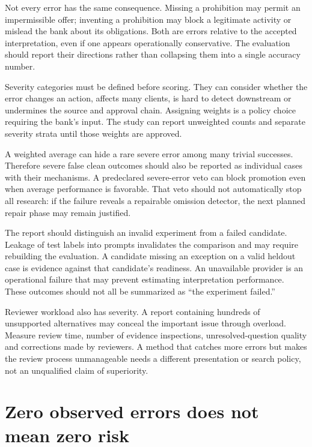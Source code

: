 Not every error has the same consequence. Missing a prohibition may permit an
impermissible offer; inventing a prohibition may block a legitimate activity or
mislead the bank about its obligations. Both are errors relative to the accepted
interpretation, even if one appears operationally conservative. The evaluation
should report their directions rather than collapsing them into a single accuracy
number.

Severity categories must be defined before scoring. They can consider whether the
error changes an action, affects many clients, is hard to detect downstream or
undermines the source and approval chain. Assigning weights is a policy choice
requiring the bank's input. The study can report unweighted counts and separate
severity strata until those weights are approved.


A weighted average can hide a rare severe error among many trivial successes.
Therefore severe false clean outcomes should also be reported as individual cases
with their mechanisms. A predeclared severe-error veto can block promotion even
when average performance is favorable. That veto should not automatically stop
all research: if the failure reveals a repairable omission detector, the next
planned repair phase may remain justified.

The report should distinguish an invalid experiment from a failed candidate.
Leakage of test labels into prompts invalidates the comparison and may require
rebuilding the evaluation. A candidate missing an exception on a valid heldout
case is evidence against that candidate's readiness. An unavailable provider is
an operational failure that may prevent estimating interpretation performance.
These outcomes should not all be summarized as ``the experiment failed.''

Reviewer workload also has severity. A report containing hundreds of unsupported
alternatives may conceal the important issue through overload. Measure review
time, number of evidence inspections, unresolved-question quality and corrections
made by reviewers. A method that catches more errors but makes the review process
unmanageable needs a different presentation or search policy, not an unqualified
claim of superiority.

\section{Zero observed errors does not mean zero risk}
\label{merge:M09:07}


